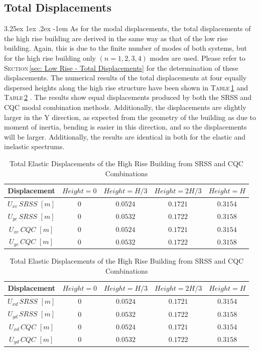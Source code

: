 \documentclass[11pt,a4paper,titlepage]{report}
\makeatletter
\renewcommand\paragraph{\@startsection{paragraph}{5}{\z@}%
  {3.25ex \@plus1ex \@minus.2ex}%
  {-1em}%
  {\normalfont\normalsize\bfseries}}
\makeatother
\begin{document}
\subsection{Total Displacements}
\paragraph{}As for the modal displacements, the total displacements of the high rise building are derived in the same way as that of the low rise building. Again, this is due to the finite number of modes of both systems, but for the high rise building only $(n=1,2,3,4)$ modes are used. Please refer to \textsc{Section}\,\ref{sec: Low Rise - Total Displacements} for the determination of these displacements. The numerical results of the total displacements at four equally dispersed heights along the high rise structure have been shown in \textsc{Table}\,\ref{tab:total elastic displacements HR} and \textsc{Table}\,\ref{tab:total design displacements HR} . The results show equal displacements produced by both the SRSS and CQC modal combination methods. Additionally, the displacements are slightly larger in the Y direction, as expected from the geometry of the building as due to moment of inertia, bending is easier in this direction, and so the displacements will be larger. Additionally, the results are identical in both for the elastic and inelastic spectrums.
\begin{table}[h]
    \centering
    \begin{tabular}{c|c|c|c|c}
    Displacement & $Height=0$ & $Height=H/3$ & $Height=2H/3$ & $Height=H$\\
    \hline
    $U_{xe}\,SRSS$ $[m]$  & $0$ & $0.0524$ & $0.1721$ & $0.3154$\\
    $U_{ye}\,SRSS$  $[m]$ & $0$ & $0.0532$ & $0.1722$ & $0.3158$\\
    $U_{xe}\,CQC$  $[m]$ & $0$ & $0.0524$ & $0.1721$ & $0.3154$\\
    $U_{ye}\,CQC$  $[m]$ & $0$ & $0.0532$ & $0.1722$ & $ 0.3158$\\
    \end{tabular}
    \caption{Total Elastic Displacements of the High Rise Building from SRSS and CQC Combinations}
    \label{tab:total elastic displacements HR}
\end{table}
\begin{table}[h]
    \centering
    \begin{tabular}{c|c|c|c|c}
    Displacement & $Height=0$ & $Height=H/3$ & $Height=2H/3$ & $Height=H$\\
    \hline
    $U_{xd}\,SRSS$ $[m]$  & $0$ & $0.0524$ & $0.1721$ & $0.3154$\\
    $U_{yd}\,SRSS$  $[m]$ & $0$ & $0.0532$ & $0.1722$ & $0.3158$\\
    $U_{xd}\,CQC$  $[m]$ & $0$ & $0.0524$ & $0.1721$ & $0.3154$\\
    $U_{yd}\,CQC$  $[m]$ & $0$ & $0.0532$ & $0.1722$ & $0.3158$\\
    \end{tabular}
    \caption{Total Elastic Displacements of the High Rise Building from SRSS and CQC Combinations}
    \label{tab:total design displacements HR}
\end{table}
\end{document}
